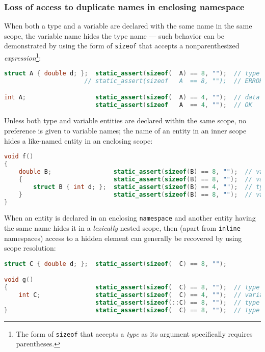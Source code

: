 \subsubsection[Loss of access to duplicate names in enclosing namespace]{Loss of access to duplicate names in enclosing namespace}\label{loss-of-access-to-duplicate-names-in-enclosing-namespace}

When both a type and a variable are declared with the same name in the
same scope, the variable name hides the type name --- such behavior can
be demonstrated by using the form of \texttt{sizeof} that accepts a
nonparenthesized \emph{expression}{\cprotect\footnote{The form of
\texttt{sizeof} that accepts a \emph{type} as its argument
  specifically requires parentheses.}}:

\begin{lstlisting}[language=C++]
struct A { double d; };  static_assert(sizeof(  A) == 8, "");  // type
                      // static_assert(sizeof   A  == 8, "");  // ERROR!

int A;                   static_assert(sizeof(  A) == 4, "");  // data
                         static_assert(sizeof   A  == 4, "");  // OK
\end{lstlisting}

\noindent Unless both type and variable entities are declared within the same
scope, no preference is given to variable names; the name of an entity
in an inner scope hides a like-named entity in an enclosing scope:

\begin{lstlisting}[language=C++]
void f()
{
    double B;                 static_assert(sizeof(B) == 8, "");  // variable
    {                         static_assert(sizeof(B) == 8, "");  // variable
        struct B { int d; };  static_assert(sizeof(B) == 4, "");  // type
    }                         static_assert(sizeof(B) == 8, "");  // variable
}
\end{lstlisting}

\noindent When an entity is declared in an enclosing \texttt{namespace} and
another entity having the same name hides it in a \emph{lexically}
nested scope, then (apart from \texttt{inline} namespaces) access to a
hidden element can generally be recovered by using scope resolution:

\begin{lstlisting}[language=C++]
struct C { double d; };  static_assert(sizeof(  C) == 8, "");

void g()
{                        static_assert(sizeof(  C) == 8, "");  // type
    int C;               static_assert(sizeof(  C) == 4, "");  // variable
                         static_assert(sizeof(::C) == 8, "");  // type
}                        static_assert(sizeof(  C) == 8, "");  // type
\end{lstlisting}

